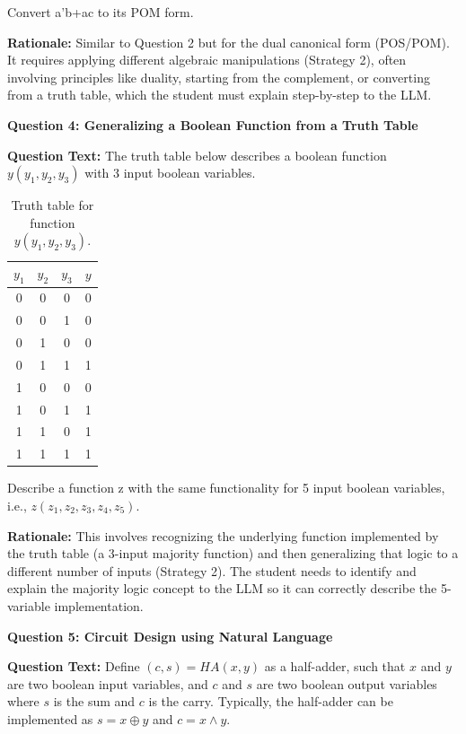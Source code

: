 \documentclass{article} %
\begin{document}
Convert a'b+ac to its POM form.

\textbf{Rationale:} Similar to Question 2 but for the dual canonical form (POS/POM). It requires applying different algebraic manipulations (Strategy 2), often involving principles like duality, starting from the complement, or converting from a truth table, which the student must explain step-by-step to the LLM.

\textbf{Question 4: Generalizing a Boolean Function from a Truth Table}

\textbf{Question Text:} The truth table below describes a boolean function $y(y_1, y_2, y_3)$ with 3 input boolean variables.

\begin{table}[h!]
\centering
\begin{tabular}{|c|c|c|c|} %
\hline
$y_1$ & $y_2$ & $y_3$ & $y$ \\ \hline %
0 & 0 & 0 & 0 \\ \hline
0 & 0 & 1 & 0 \\ \hline
0 & 1 & 0 & 0 \\ \hline
0 & 1 & 1 & 1 \\ \hline
1 & 0 & 0 & 0 \\ \hline
1 & 0 & 1 & 1 \\ \hline
1 & 1 & 0 & 1 \\ \hline
1 & 1 & 1 & 1 \\ \hline
\end{tabular}
\caption{Truth table for function $y(y_1, y_2, y_3)$.} %
\label{tab:truth_table_q4_full} %
\end{table}

Describe a function z with the same functionality for 5 input boolean variables, i.e., $z(z_1,z_2,z_3,z_4,z_5)$.

\textbf{Rationale:} This involves recognizing the underlying function implemented by the truth table (a 3-input majority function) and then generalizing that logic to a different number of inputs (Strategy 2). The student needs to identify and explain the majority logic concept to the LLM so it can correctly describe the 5-variable implementation.

\textbf{Question 5: Circuit Design using Natural Language}

\textbf{Question Text:} Define $(c, s) = HA(x, y)$ as a half-adder, such that $x$ and $y$ are two boolean input variables, and $c$ and $s$ are two boolean output variables where $s$ is the sum and $c$ is the carry. Typically, the half-adder can be implemented as $s=x \oplus y$ and $c = x \wedge y$.
\end{document}
